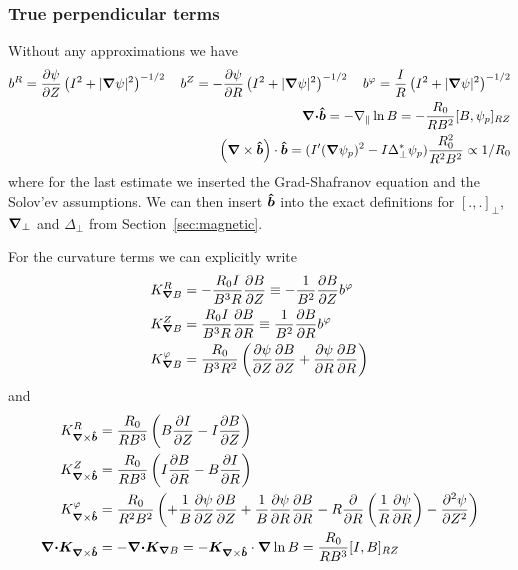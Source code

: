 \subsubsection{True perpendicular terms} \label{sec:trueapprox}

Without any approximations we have
\begin{align}
b^R = {\frac{\partial \psi}{\partial Z}}\left(I^2+|{\boldsymbol{\nabla}}\psi|^2\right)^{-1/2} \quad
b^Z = -{\frac{\partial \psi}{\partial R}}\left(I^2+|{\boldsymbol{\nabla}}\psi|^2\right)^{-1/2} \quad 
b^\varphi = \frac{I}{R}\left(I^2+|{\boldsymbol{\nabla}}\psi|^2\right)^{-1/2} \\
{\boldsymbol{{\boldsymbol{\nabla}}\cdot}}\bm{\hat{b}} = -\nabla_\parallel \ln B = -\frac{R_0}{R B^2}[B,\psi_p]_{RZ} \\
\left({{\boldsymbol{\nabla}}\times\bm{\hat{b}}}\right) \cdot\bm{\hat{b}} =
    (I'({\boldsymbol{\nabla}}\psi_p)^2 - I \Delta_\perp^* \psi_p)\frac{ R_0^2}{R^2B^2} \propto 1/R_0
\label{}
\end{align}
where for the last
estimate we inserted the Grad-Shafranov equation and the Solov'ev assumptions.
We can then insert $\bm{\hat{b}}$ into the exact definitions for $[.,.]_\perp$, ${\boldsymbol{\nabla}}_{\perp}$ and $\Delta_\perp$ from Section~\ref{sec:magnetic}.

For the curvature terms we can explicitly write
\begin{align}
K_{{\boldsymbol{\nabla}} B}^R &= -\frac{R_0 I}{B^3R}\frac{\partial B}{\partial Z} \equiv -\frac{1}{B^2}\frac{\partial B}{\partial Z}b^\varphi \\
K_{{\boldsymbol{\nabla}} B}^Z &= \frac{R_0 I}{B^3R}\frac{\partial B}{\partial R}\equiv \frac{1}{B^2}\frac{\partial B}{\partial R}b^\varphi \\
K_{{\boldsymbol{\nabla}} B}^\varphi &= \frac{R_0}{B^3R^2}\left(
      \frac{\partial \psi}{\partial Z} \frac{\partial B}{\partial Z}
    + \frac{\partial \psi}{\partial R}\frac{\partial B}{\partial R}\right)
\label{}
\end{align}
and
\begin{align}
K_{{\boldsymbol{\nabla}}\times\bm{\hat{b}}}^R &= \frac{R_0 }{RB^3}\left( B\frac{\partial I}{\partial Z} -I\frac{\partial B}{\partial Z}\right) \\
K_{{\boldsymbol{\nabla}}\times\bm{\hat{b}}}^Z &= \frac{R_0 }{RB^3} \left( I\frac{\partial B}{\partial R} - B\frac{\partial I}{\partial R} \right)\\
K_{{\boldsymbol{\nabla}}\times\bm{\hat{b}}}^\varphi &= \frac{R_0}{R^2B^2}\left(
+ \frac{1}{B}\frac{\partial\psi}{\partial Z} \frac{\partial B}{\partial Z}
+ \frac{1}{B}\frac{\partial \psi}{\partial R}\frac{\partial B}{\partial R}
-R\frac{\partial}{\partial R}\left(\frac{1}{R}\frac{\partial\psi}{\partial R}\right) 
- \frac{\partial^2 \psi}{\partial Z^2}
\right) \\
{\boldsymbol{{\boldsymbol{\nabla}}\cdot}}{{\boldsymbol{K}}_{{\boldsymbol{\nabla}}\times\bm{\hat{b}}}} &= -{\boldsymbol{{\boldsymbol{\nabla}}\cdot}}{{\boldsymbol{K}}_{{\boldsymbol{\nabla}} B}}= -{{\boldsymbol{K}}_{{\boldsymbol{\nabla}}\times\bm{\hat{b}}}}\cdot{\boldsymbol{\nabla}}\ln B = \frac{R_0}{RB^3}[I,B]_{RZ}
\label{}
\end{align}

